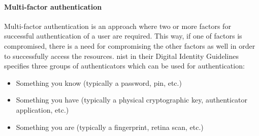 \paragraph{Multi-factor authentication}
Multi-factor authentication is an approach where two or more factors for successful authentication of a user are required. This way, if one of factors is compromised, there is a need for compromising the other factors as well in order to successfully access the resources. \acrshort{nist} in their Digital Identity Guidelines~\cite{Grassi2017Digital3} specifies three groups of authenticators which can be used for authentication:
\begin{itemize}[noitemsep]
    \item Something you know (typically a password, \acrshort{pin}, etc.)
    \item Something you have (typically a physical cryptographic key, authenticator application, etc.)
    \item Something you are (typically a fingerprint, retina scan, etc.)
\end{itemize}